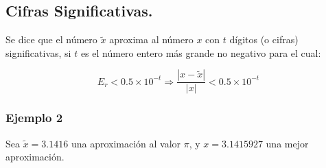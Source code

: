 \documentclass[
]{article}
\begin{document}
\subsection{Cifras Significativas.}\label{cifras-significativas.}

Se dice que el número \(\tilde{x}\) aproxima al número \(x\) con \(t\)
dígitos (o cifras) significativas, si \(t\) es el número entero más
grande no negativo para el cual:

\[E_r<0.5\times10^{-t} \Rightarrow \dfrac{|x - \tilde{x}|}{|x|} < 0.5 \times 10^{-t}\]

\subsubsection{Ejemplo 2}\label{ejemplo-2}

Sea \(\tilde{x} = 3.1416\) una aproximación al valor \(\pi\), y
\(x = 3.1415927\) una mejor aproximación.
\end{document}
